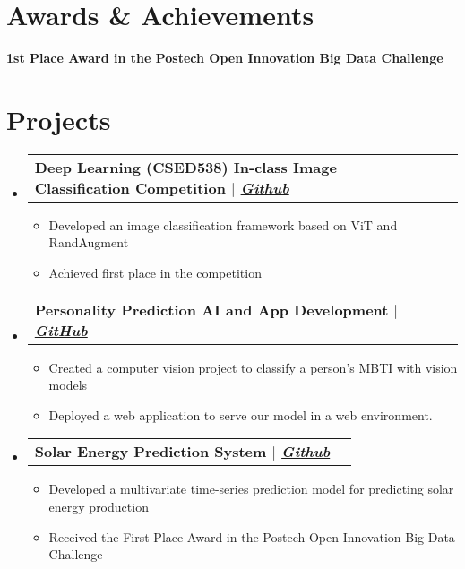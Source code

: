 \documentclass[letterpaper,11pt]{article}
\makeatletter
\newcommand{\resumeItem}[1]{
  \item\small{
    {#1 \vspace{-2pt}}
  }
}
\newcommand{\resumeProjectHeading}[1]{
  \vspace{-2pt}\item
    \begin{tabular*}{0.97\textwidth}[t]{l@{\extracolsep{\fill}}r}
      \textbf{#1} \\
    \end{tabular*}\vspace{-7pt}
}
\newcommand{\resumeSubHeadingListStart}{\begin{itemize}[leftmargin=0.15in, label={}]}
\newcommand{\resumeSubHeadingListEnd}{\end{itemize}}
\newcommand{\resumeItemListStart}{\begin{itemize}}
\newcommand{\resumeItemListEnd}{\end{itemize}\vspace{-5pt}}
\makeatother
\begin{document}

\section{Awards \& Achievements}
  \vspace{2pt}
  \resumeSubHeadingListStart
    \small{\item{
        \textbf{1st Place Award in the Postech Open Innovation Big Data Challenge} \\ \vspace{3pt}
    }}
  \resumeSubHeadingListEnd




\section{Projects}
    \vspace{3pt}
    \resumeSubHeadingListStart

      \resumeProjectHeading
        {\textbf{Deep Learning (CSED538) In-class Image Classification Competition} $|$ \emph{\href{https://github.com/happyhappy-jun/CSED538-final-project}{Github}}}
        \resumeItemListStart
            \resumeItem{Developed an image classification framework based on ViT and RandAugment}
            \resumeItem{Achieved first place in the competition}
        \resumeItemListEnd

        
      \resumeProjectHeading
        {\textbf{Personality Prediction AI and App Development} $|$ \emph{\href{https://github.com/hhyy0401/UGRP}{GitHub}}}
          \resumeItemListStart
            \resumeItem{Created a computer vision project to classify a person's MBTI with vision models}
            \resumeItem{Deployed a web application to serve our model in a web environment.}
          \resumeItemListEnd
          
        \resumeProjectHeading
            {\textbf{Solar Energy Prediction System} $|$ \emph{\href{https://github.com/happyhappy-jun/2020-Postech-Open-innovation-Bigdata-Challenge}{Github}}}
            \resumeItemListStart
                \resumeItem{Developed a multivariate time-series prediction model for predicting solar energy production}
                \resumeItem{Received the First Place Award in the Postech Open Innovation Big Data Challenge}
            \resumeItemListEnd
    \resumeSubHeadingListEnd
\end{document}
